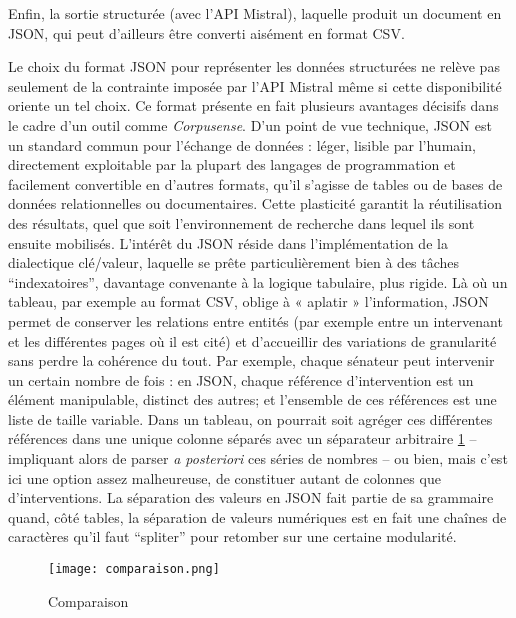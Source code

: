 Enfin, la sortie structurée (avec l'API Mistral), laquelle produit un document en JSON, qui peut d'ailleurs être converti aisément en format CSV.

Le choix du format JSON pour représenter les données structurées ne relève pas seulement de la contrainte imposée par l’API Mistral même si cette disponibilité oriente un tel choix. Ce format présente en fait plusieurs avantages décisifs dans le cadre d’un outil comme \emph{Corpusense}. D’un point de vue technique, JSON est un standard commun pour l’échange de données : léger, lisible par l’humain, directement exploitable par la plupart des langages de programmation et facilement convertible en d’autres formats, qu’il s’agisse de tables ou de bases de données relationnelles ou documentaires. Cette plasticité garantit la réutilisation des résultats, quel que soit l’environnement de recherche dans lequel ils sont ensuite mobilisés. L’intérêt du JSON réside dans l'implémentation de la dialectique clé/valeur, laquelle se prête particulièrement bien à des tâches \enquote{indexatoires}, davantage convenante à la logique tabulaire, plus rigide. Là où un tableau, par exemple au format CSV, oblige à « aplatir » l’information, JSON permet de conserver les relations entre entités (par exemple entre un intervenant et les différentes pages où il est cité) et d’accueillir des variations de granularité sans perdre la cohérence du tout. Par exemple, chaque sénateur peut intervenir un certain nombre de fois : en JSON, chaque référence d'intervention est un élément manipulable, distinct des autres; et l'ensemble de ces références est une liste de taille variable. Dans un tableau, on pourrait soit agréger ces différentes références dans une unique colonne séparés avec un séparateur arbitraire \ref{fig:comparaison} -- impliquant alors de parser \emph{a posteriori} ces séries de nombres -- ou bien, mais c'est ici une option assez malheureuse, de constituer autant de colonnes que d'interventions. La séparation des valeurs en JSON fait partie de sa grammaire quand, côté tables, la séparation de valeurs numériques est en fait une chaînes de caractères qu'il faut \enquote{spliter} pour retomber sur une certaine modularité.

\begin{figure}[htbp]
\centering
\texttt{[image: comparaison.png]}
\caption{Comparaison}
\label{fig:comparaison}
\end{figure}

